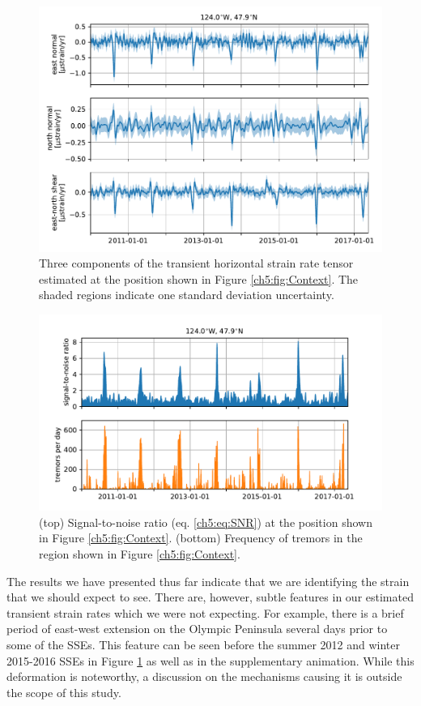 \begin{figure}
\includegraphics{ch5/figures/strain_ts/strain-ts.pdf}
\caption{Three components of the transient horizontal strain rate tensor estimated at the position shown in Figure \ref{ch5:fig:Context}. The shaded regions indicate one standard deviation uncertainty.}   
\label{ch5:fig:StrainTs}
\end{figure}

\begin{figure}
\includegraphics{ch5/figures/strain_ts/mag-ts.pdf}
\caption{(top) Signal-to-noise ratio (eq. \ref{ch5:eq:SNR}) at the position shown in Figure \ref{ch5:fig:Context}. (bottom) Frequency of tremors in the region shown in Figure \ref{ch5:fig:Context}.}   
\label{ch5:fig:StrainMag}
\end{figure}

The results we have presented thus far indicate that we are identifying the strain that we should expect to see. There are, however, subtle features in our estimated transient strain rates which we were not expecting. For example, there is a brief period of east-west extension on the Olympic Peninsula several days prior to some of the SSEs. This feature can be seen before the summer 2012 and winter 2015-2016 SSEs in Figure \ref{ch5:fig:StrainTs} as well as in the supplementary animation. While this deformation is noteworthy, a discussion on the mechanisms causing it is outside the scope of this study.


